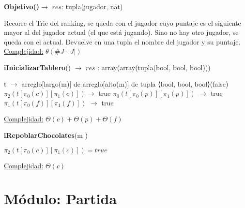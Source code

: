 \documentclass[10pt,a4paper]{article}
\begin{document}
\begin{Algoritmos}
    \begin{algorithm}[H]{\textbf{Objetivo()}}$\to$ $res$: tupla(jugador, nat)
        \begin{algorithmic}
            \State Recorre el Trie del ranking, se queda con el jugador cuyo puntaje es el siguiente mayor al del jugador actual (el que está jugando). Sino no hay otro jugador, se queda con el actual.
            Devuelve en una tupla el nombre del jugador y su puntaje.
            \State \underline{Complejidad:} $\theta(\#J \cdot |J|)$
        \end{algorithmic}
    \end{algorithm}

    \begin{algorithm}[H]{\textbf{iInicializarTablero}() $\to$ $res$ : array(array(tupla(bool, bool, bool)))}
        \begin{algorithmic}
        
            \State t $\to$ arreglo[largo(m)] de arreglo[alto(m)] de tupla ⟨bool, bool, bool⟩(false)
		     
			    \State $\pi_2(t[\pi_0(c)][\pi_1(c)])$$\to$ true
		    \EndFor
		     
			    \State $\pi_0(t[\pi_0(p)][\pi_1(p)])$ $\to$ true
	        \EndFor
		     
			    \State $\pi_1(t[\pi_0(f)][\pi_1(f)])$ $\to$ true
		    \EndFor
            
        
            \Statex \underline{Complejidad:} $\Theta(c) + \Theta(p) + \Theta(f)$
        \end{algorithmic}
    \end{algorithm}

    \begin{algorithm}[H]{\textbf{iRepoblarChocolates}(m )}
        \begin{algorithmic}
                \State $\pi_2(t[\pi_0(c)][\pi_1(c)]) = true$
            \EndFor
            
        
            \Statex \underline{Complejidad:} $\Theta(c)$
        \end{algorithmic}
    \end{algorithm}
    
\end{Algoritmos}

\section{Módulo: Partida}
\end{document}
